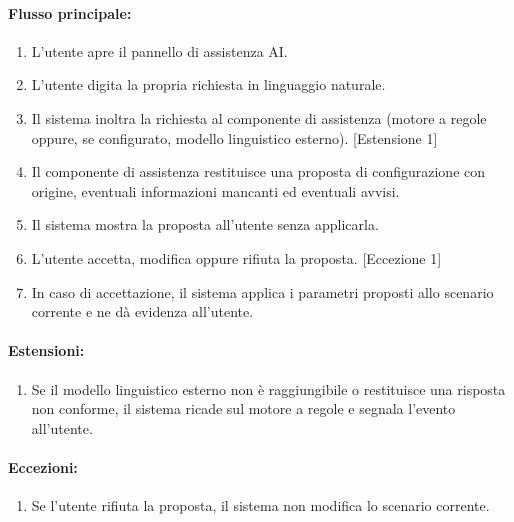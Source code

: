 \paragraph{Flusso principale:}
\begin{enumerate}
    \item L'utente apre il pannello di assistenza AI.
    \item L'utente digita la propria richiesta in linguaggio naturale.
    \item Il sistema inoltra la richiesta al componente di assistenza (motore a regole oppure, se configurato, modello linguistico esterno). [Estensione 1]
    \item Il componente di assistenza restituisce una proposta di configurazione con origine, eventuali informazioni mancanti ed eventuali avvisi.
    \item Il sistema mostra la proposta all'utente senza applicarla.
    \item L'utente accetta, modifica oppure rifiuta la proposta. [Eccezione 1]
    \item In caso di accettazione, il sistema applica i parametri proposti allo scenario corrente e ne dà evidenza all'utente.
\end{enumerate}

\paragraph{Estensioni:}
\begin{enumerate}
    \item Se il modello linguistico esterno non è raggiungibile o restituisce una risposta non conforme, il sistema ricade sul motore a regole e segnala l'evento all'utente.
\end{enumerate}

\paragraph{Eccezioni:}
\begin{enumerate}
    \item Se l'utente rifiuta la proposta, il sistema non modifica lo scenario corrente.
\end{enumerate}